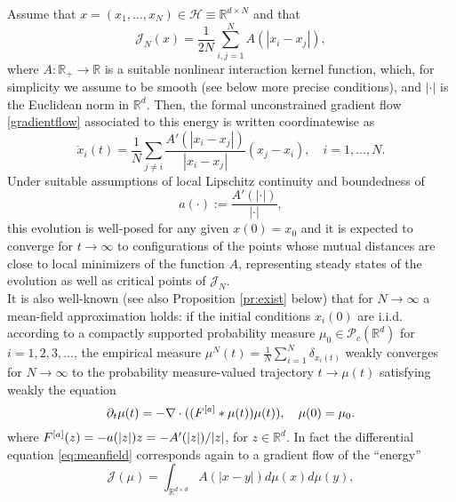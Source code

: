 Assume that $x=(x_1,\dots,x_N) \in \mathcal H \equiv  \mathbb R^{d\times N}$ and that 
$$
\mathcal J_N(x) = \frac{1}{2N} \sum_{i,j=1}^N A(| x_i -  x_j |),
$$
where $A:\mathbb R_+ \to \mathbb R$ is a suitable nonlinear interaction kernel function, which, for simplicity we assume to be smooth (see below more precise conditions), and $|\cdot|$ is the Euclidean norm in $\mathbb R^d$. Then, the formal unconstrained gradient flow \eqref{gradientflow} associated to this energy is written coordinatewise as
\begin{equation}\label{fdgradientflow}
\dot x_i(t) = \frac{1}{N} \sum_{j \neq i} \frac{A'(| x_i -  x_j |)}{| x_i -  x_j |} (x_j - x_i), \quad i=1,\dots,N.
\end{equation}
Under suitable assumptions of local Lipschitz continuity and boundedness of 
\begin{equation}\label{intker}
a(\cdot) := \frac{A'(|\cdot|)}{| \cdot |},
\end{equation} this evolution is well-posed for any given $x(0)=x_0$ and it is expected to converge for $t \to \infty$ to configurations of the points whose mutual distances are close to local minimizers of the function $A$, representing steady states of the evolution as well as critical points of $\mathcal J_N$.\\
It is also well-known \cite{AGS} (see also Proposition \ref{pr:exist} below) that for $N \to \infty$ a mean-field approximation holds: if the initial conditions $x_i(0)$ are i.i.d. according to a compactly supported probability measure $\mu_0 \in \mathcal P_c(\mathbb R^d)$ for $i=1,2,3, \dots$, the empirical measure $\mu^N(t) = \frac{1}{N} \sum_{i=1}^N \delta_{x_i(t)}$ weakly converges for $N \to \infty$  to the probability measure-valued trajectory $t \to \mu(t)$ satisfying weakly the equation
\begin{equation}\label{eq:meanfield}
\partial_t \mu(t) = - \nabla \cdot ((F^{[a]} * \mu(t)) \mu(t)), \quad \mu(0)=\mu_0.
\end{equation}
where $F^{[a]}(z) =-a(|z|)z=-A'(|z|)/|z|$, for $z \in \mathbb R^{d}$. In fact the differential equation \eqref{eq:meanfield} corresponds again to a gradient flow of the ``energy''
$$
\mathcal J (\mu) = \int_{\mathbb R^{d\times d}} A(| x-  y |) d \mu(x) d\mu(y),
$$
